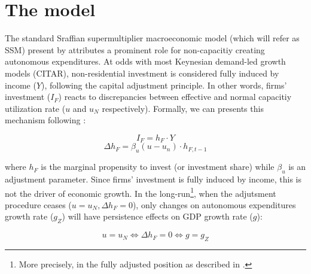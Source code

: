 \documentclass{SelfArx}
\begin{document}
\section{The model}
\label{sec:model:ch_super}
The standard Sraffian supermultiplier macroeconomic model (which will refer as SSM) present by \textcite{serrano_1995_Long,bortis_1996_Structural} attributes a prominent role for non-capacitiy creating autonomous expenditures.
At odds with most Keynesian demand-led growth models (CITAR), non-residential investment is considered fully induced by income (\(Y\)), following the capital adjustment principle.
In other words, firms' investment (\(I_{F}\)) reacts to discrepancies between effective and normal capacitiy utilization rate (\(u\) and \(u_{N}\) respectively).
Formally, we can presents this mechanism following \textcite{serrano_2017_Sraffianc}:
\begin{latex}
\begin{equation}
\label{Ch_super_EQ_inv_super_macro}
I_{F} = h_{F}\cdot Y
\end{equation}
\begin{equation}
\Delta h_{F} = \beta_{u}(u - u_{n})\cdot h_{F,t-1}
\end{equation}
\end{latex}
where \(h_{F}\) is the marginal propensity to invest (or investment share) while \(\beta_{u}\) is an adjustment parameter.
Since firms' investment is fully induced by income, this is not the driver of economic growth.
In the long-run\footnote{More precisely, in the fully adjusted position as described in \cite{freitas_2015_Growthb}.}, when the adjutsment procedure ceases (\(u = u_{N}, \Delta h_{F} = 0\)), only changes on autonomous expenditures growth rate (\(g_{Z}\)) will have persistence effects on GDP growth rate (\(g\)):
\begin{latex}
\begin{equation}
u = u_{N} \Leftrightarrow \Delta h_{F} = 0 \Leftrightarrow g = g_{Z}
\end{equation}
\end{latex}
\end{document}
